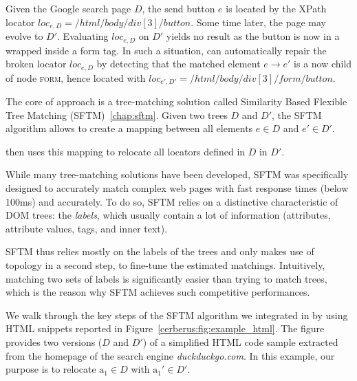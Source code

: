 \begin{ex}
Given the Google search page $D$, the send button $e$ is located by the XPath locator $loc_{e,D} = /html/body/div[3]/button$.
Some time later, the page may evolve to $D'$.
Evaluating $loc_{e,D}$ on $D'$ yields no result as the button is now in a wrapped inside a \textsf{form} tag.
In such a situation, \erratum{} can automatically repair the broken locator $loc_{e,D}$ by detecting that the matched element $e \to e'$ is a now child of node \textsc{form}, hence located with $loc_{e',D'} = /html/body/div[3]/form/button$.
\end{ex}

The core of \erratum approach is a tree-matching solution called Similarity Based Flexible Tree Matching (SFTM)~\ref{chap:sftm}. 
Given two trees $D$ and $D'$, the SFTM algorithm allows to create a mapping between all elements $e \in D$ and $e' \in D'$.

\erratum then uses this mapping to relocate all locators defined in $D$ in $D'$.

While many tree-matching solutions have been developed, SFTM was specifically designed to accurately match complex web pages with fast response times (below 100ms) and accurately.
To do so, SFTM relies on a distinctive characteristic of DOM trees: the \emph{labels}, which usually contain a lot of information (attributes, attribute values, tags, and inner text).

SFTM thus relies mostly on the labels of the trees and only makes use of topology in a second step, to fine-tune the estimated matchings.
Intuitively, matching two sets of labels is significantly easier than trying to match trees, which is the reason why SFTM achieves such competitive performances.

We walk through the key steps of the SFTM algorithm we integrated in \erratum{} by using HTML snippets reported in Figure~\ref{cerberus:fig:example_html}.
The figure provides two versions ($D$ and $D'$) of a simplified HTML code sample extracted from the homepage of the search engine \textit{duckduckgo.com}.
In this example, our purpose is to relocate $\text{a}_1 \in D$ with $\text{a}_1' \in D'$.

